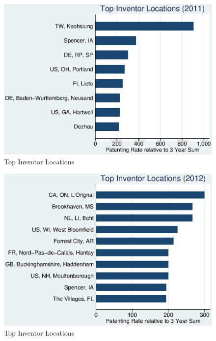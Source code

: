 \documentclass[12pt]{article}
\begin{document}
\begin{figure}[h]
\begin{centering}
  \includegraphics{r32011top10}
  \caption{Top Inventor Locations}
  \label{fig:r32011top10}
\end{centering}
\end{figure}

\begin{figure}[h]
\begin{centering}
  \includegraphics{r32012top10}
  \caption{Top Inventor Locations}
  \label{fig:r32012top10}
\end{centering}
\end{figure}
\end{document}

